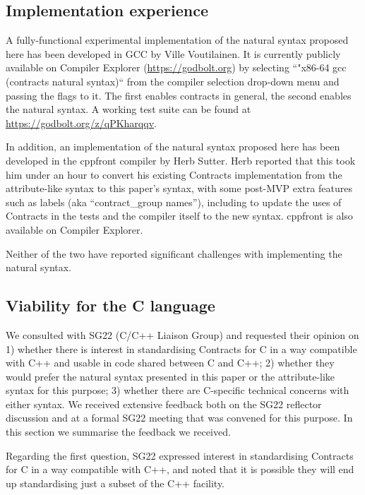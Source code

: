 \subsection{Implementation experience}
\label{subsec:implxp}

A fully-functional experimental implementation of the natural syntax proposed here has been developed in GCC by Ville Voutilainen. It is currently publicly available on Compiler Explorer (\href{https://godbolt.org}{https://godbolt.org}) by selecting ``"x86-64 gcc (contracts natural syntax)`` from the compiler selection drop-down menu and passing the flags  to it. The first enables contracts in general, the second enables the natural syntax. A working test suite can be found at \href{https://godbolt.org/z/qPKharqqv}{https://godbolt.org/z/qPKharqqv}.


In addition, an implementation of the natural syntax proposed here has been developed in the cppfront compiler by Herb Sutter. Herb reported that this took him under an hour to convert his existing Contracts implementation from the attribute-like syntax to this paper’s syntax, with some post-MVP extra features such as labels (aka ``contract_group names''), including to update the uses of Contracts in the tests and the compiler itself to the new syntax. cppfront is also available on Compiler Explorer.

Neither of the two have reported significant challenges with implementing the natural syntax.


\subsection{Viability for the C language}
\label{subsec:clang}

We consulted with SG22 (C/C++ Liaison Group) and requested their opinion on 1) whether there is interest in standardising Contracts for C in a way compatible with C++ and usable in code shared between C and C++; 2) whether they would prefer the natural syntax presented in this paper or the attribute-like syntax \cite{P2935R3} for this purpose; 3) whether there are C-specific technical concerns with either syntax. We received extensive feedback both on the SG22 reflector discussion and at a formal SG22 meeting that was convened for this purpose. In this section we summarise the feedback we received.

Regarding the first question, SG22 expressed interest in standardising Contracts for C in a way compatible with C++, and noted that it is possible they will end up standardising just a subset of the C++ facility.

